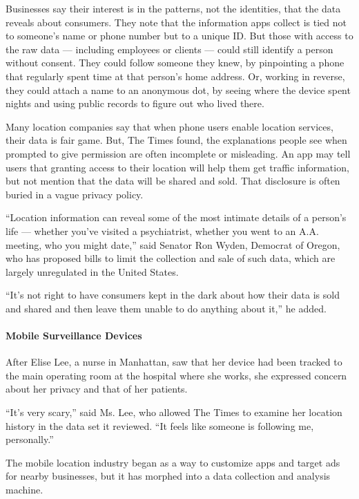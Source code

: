 Businesses say their interest is in the patterns, not the identities,
that the data reveals about consumers. They note that the information
apps collect is tied not to someone's name or phone number but to a
unique ID. But those with access to the raw data --- including employees
or clients --- could still identify a person without consent. They could
follow someone they knew, by pinpointing a phone that regularly spent
time at that person's home address. Or, working in reverse, they could
attach a name to an anonymous dot, by seeing where the device spent
nights and using public records to figure out who lived there.

Many location companies say that when phone users enable location
services, their data is fair game. But, The Times found, the
explanations people see when prompted to give permission are often
incomplete or misleading. An app may tell users that granting access to
their location will help them get traffic information, but not mention
that the data will be shared and sold. That disclosure is often buried
in a vague privacy policy.

``Location information can reveal some of the most intimate details of a
person's life --- whether you've visited a psychiatrist, whether you
went to an A.A. meeting, who you might date,'' said Senator Ron Wyden,
Democrat of Oregon, who has proposed bills to limit the collection and
sale of such data, which are largely unregulated in the United States.

``It's not right to have consumers kept in the dark about how their data
is sold and shared and then leave them unable to do anything about it,''
he added.

\hypertarget{mobile-surveillance-devices}{%
\paragraph{Mobile Surveillance
Devices}\label{mobile-surveillance-devices}}

After Elise Lee, a nurse in Manhattan, saw that her device had been
tracked to the main operating room at the hospital where she works, she
expressed concern about her privacy and that of her patients.

``It's very scary,'' said Ms. Lee, who allowed The Times to examine her
location history in the data set it reviewed. ``It feels like someone is
following me, personally.''

The mobile location industry began as a way to customize apps and target
ads for nearby businesses, but it has morphed into a data collection and
analysis machine.

